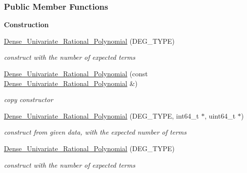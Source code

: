 \subsubsection*{Public Member Functions}
\begin{Indent}\textbf{ Construction}\par
\begin{DoxyCompactItemize}
\item 
\mbox{\label{group__polygroup_a373bccc0cf3c06160702a484edb5ca10}} 
\hyperlink{group__polygroup_a373bccc0cf3c06160702a484edb5ca10}{Dense\+\_\+\+Univariate\+\_\+\+Rational\+\_\+\+Polynomial} (D\+E\+G\+\_\+\+T\+Y\+PE)
\begin{DoxyCompactList}\small\item\em construct with the number of expected terms \end{DoxyCompactList}\item 
\mbox{\label{group__polygroup_a809d897a0cc6a226c42b80617c2aeab5}} 
\hyperlink{group__polygroup_a809d897a0cc6a226c42b80617c2aeab5}{Dense\+\_\+\+Univariate\+\_\+\+Rational\+\_\+\+Polynomial} (const \hyperlink{group__polygroup_class_dense___univariate___rational___polynomial}{Dense\+\_\+\+Univariate\+\_\+\+Rational\+\_\+\+Polynomial} \&)
\begin{DoxyCompactList}\small\item\em copy constructor \end{DoxyCompactList}\item 
\mbox{\label{group__polygroup_a355c74bb36083fa2407a28ac066ca081}} 
\hyperlink{group__polygroup_a355c74bb36083fa2407a28ac066ca081}{Dense\+\_\+\+Univariate\+\_\+\+Rational\+\_\+\+Polynomial} (D\+E\+G\+\_\+\+T\+Y\+PE, int64\+\_\+t $\ast$, uint64\+\_\+t $\ast$)
\begin{DoxyCompactList}\small\item\em construct from given data, with the expected number of terms \end{DoxyCompactList}\item 
\mbox{\label{group__polygroup_a373bccc0cf3c06160702a484edb5ca10}} 
\hyperlink{group__polygroup_a373bccc0cf3c06160702a484edb5ca10}{Dense\+\_\+\+Univariate\+\_\+\+Rational\+\_\+\+Polynomial} (D\+E\+G\+\_\+\+T\+Y\+PE)
\begin{DoxyCompactList}\small\item\em construct with the number of expected terms \end{DoxyCompactList}\item 

\end{DoxyCompactItemize}
\end{Indent}
